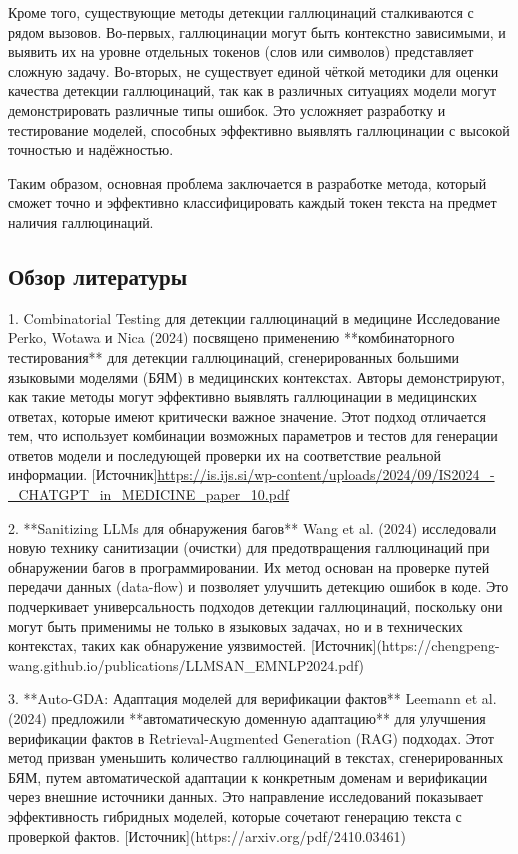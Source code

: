 \documentclass[12pt]{article}
\begin{document}
Кроме того, существующие методы детекции галлюцинаций сталкиваются с рядом вызовов. Во-первых, галлюцинации могут быть контекстно зависимыми, и выявить их на уровне отдельных токенов (слов или символов) представляет сложную задачу. Во-вторых, не существует единой чёткой методики для оценки качества детекции галлюцинаций, так как в различных ситуациях модели могут демонстрировать различные типы ошибок. Это усложняет разработку и тестирование моделей, способных эффективно выявлять галлюцинации с высокой точностью и надёжностью.

Таким образом, основная проблема заключается в разработке метода, который сможет точно и эффективно классифицировать каждый токен текста на предмет наличия галлюцинаций.

\subsection{Обзор литературы}
1. Combinatorial Testing для детекции галлюцинаций в медицине
Исследование Perko, Wotawa и Nica (2024) посвящено применению **комбинаторного тестирования** для детекции галлюцинаций, сгенерированных большими языковыми моделями (БЯМ) в медицинских контекстах. Авторы демонстрируют, как такие методы могут эффективно выявлять галлюцинации в медицинских ответах, которые имеют критически важное значение. Этот подход отличается тем, что использует комбинации возможных параметров и тестов для генерации ответов модели и последующей проверки их на соответствие реальной информации. [Источник]\url{https://is.ijs.si/wp-content/uploads/2024/09/IS2024_-_CHATGPT_in_MEDICINE_paper_10.pdf}

2. **Sanitizing LLMs для обнаружения багов**  
Wang et al. (2024) исследовали новую технику санитизации (очистки) для предотвращения галлюцинаций при обнаружении багов в программировании. Их метод основан на проверке путей передачи данных (data-flow) и позволяет улучшить детекцию ошибок в коде. Это подчеркивает универсальность подходов детекции галлюцинаций, поскольку они могут быть применимы не только в языковых задачах, но и в технических контекстах, таких как обнаружение уязвимостей. [Источник](https://chengpeng-wang.github.io/publications/LLMSAN_EMNLP2024.pdf)

3. **Auto-GDA: Адаптация моделей для верификации фактов**  
Leemann et al. (2024) предложили **автоматическую доменную адаптацию** для улучшения верификации фактов в Retrieval-Augmented Generation (RAG) подходах. Этот метод призван уменьшить количество галлюцинаций в текстах, сгенерированных БЯМ, путем автоматической адаптации к конкретным доменам и верификации через внешние источники данных. Это направление исследований показывает эффективность гибридных моделей, которые сочетают генерацию текста с проверкой фактов. [Источник](https://arxiv.org/pdf/2410.03461)
\end{document}
